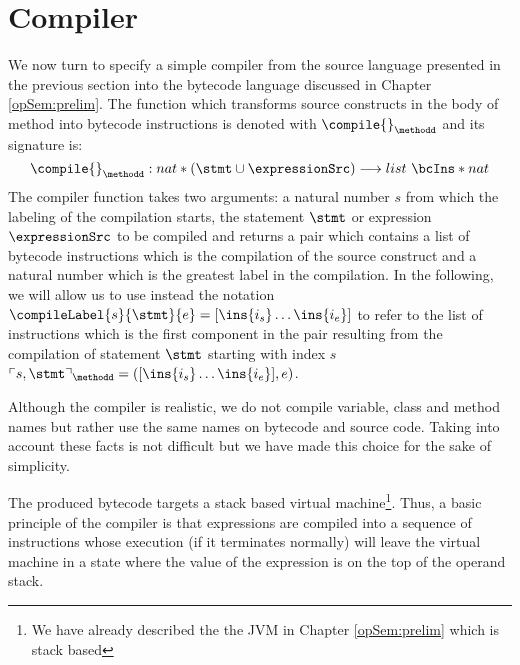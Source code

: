 

\newtheorem{Compiler}{Definition}

\section{Compiler} \label{compile}

 We now turn to specify a simple compiler from the source language presented in the previous section
 into the bytecode language discussed in  Chapter \ref{opSem:prelim}. The function which transforms
 source constructs in the body of method \methodd{} into bytecode instructions is denoted with
 $\compile{}_{\methodd}$ and its signature is:  
 $$ \compile{ }_{\methodd} : nat * (\stmt \cup \expressionSrc ) \longrightarrow  list \ \bcIns * nat  $$
 The compiler function takes two arguments: a natural number $s$ from which the labeling of the compilation starts,
 the statement $\stmt$ or expression $\expressionSrc$  to be compiled and
 returns a pair which contains a list of bytecode instructions which is the compilation of the source construct
 and  a natural number which is the greatest label in the compilation. In the following, we will allow us
 to use instead the notation 
 $ \compileLabel{s}{\stmt}{e} =[\ins{i_s} \ldots \ins{i_e} ] $
 to refer to the list of instructions  which is the first component in the pair resulting from the compilation of 
 statement $\stmt$  starting with index $s$ \ 
 $\ulcorner  s, \stmt  \urcorner_{\methodd} = ( [\ins{i_s} \ldots \ins{i_e}], e) $.

 Although the compiler is realistic, we do not compile variable, class and method names but rather use the same names on bytecode
 and source code. Taking into account these facts is not difficult but we have made this choice for the sake of simplicity.



 The produced bytecode targets a stack based virtual machine\footnote{We have already described the
 the JVM in Chapter \ref{opSem:prelim} which is stack based}. Thus, a basic principle of the compiler 
 is that  expressions are compiled into a sequence of instructions whose execution (if it terminates normally)  
 will leave the virtual machine in a state where the value of the expression is on the top of the operand stack.

